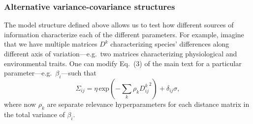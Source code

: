 \documentclass[11pt, a4paper]{article}
\begin{document}

%

\subsubsection*{Alternative variance-covariance structures}
The model structure defined above allows us to test how different sources of information characterize each of the different parameters. For example, imagine that we have multiple matrices $D^k$ characterizing species' differences along different axis of variation---e.g.~two matrices characterizing physiological and environmental traits. One can modify Eq.~(3) of the main text for a particular parameter---e.g.~$\beta_{i}$---such that
\begin{equation} 
\Sigma_{ij} = \eta\,\text{exp}\left(-\sum_k\rho_{k} {D^{k}_{ij}}^2\right) + \delta_{ij} \sigma ,
\label{eq:covariance-complex}
\end{equation}
where now $\rho_{k}$ are separate relevance hyperparameters for each distance matrix in the total variance of $\beta_i$.
\end{document}
